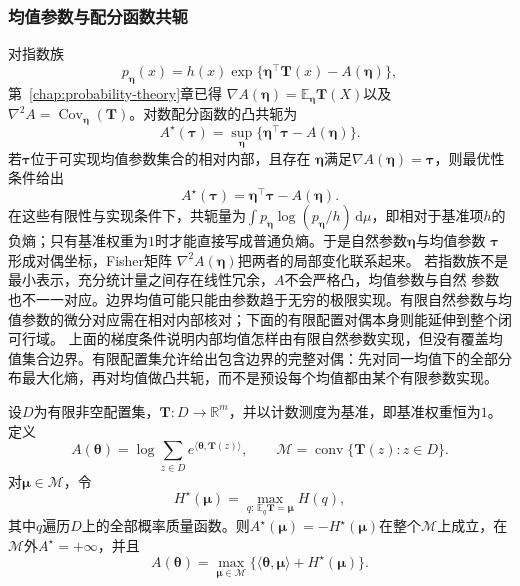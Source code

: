 \subsubsection{均值参数与配分函数共轭}
对指数族
\[
  p_{\bm{\eta}}(x)
  =h(x)\exp\{
    \bm{\eta}^{\top}\bm{T}(x)-A(\bm{\eta})\},
\]
第~\ref{chap:probability-theory}章已得
\(\nabla A(\bm{\eta})=\mathbb{E}_{\bm{\eta}}\bm{T}(X)\)以及
\(\nabla^2A=\operatorname{Cov}_{\bm{\eta}}(\bm{T})\)。对数配分函数的凸共轭为
\begin{equation}
  A^\star(\bm{\tau})
  =\sup_{\bm{\eta}}
  \{\bm{\eta}^{\top}\bm{\tau}-A(\bm{\eta})\}.
  \label{eq:information-log-partition-conjugate}
\end{equation}
若\(\bm{\tau}\)位于可实现均值参数集合的相对内部，且存在
\(\bm{\eta}\)满足\(\nabla A(\bm{\eta})=\bm{\tau}\)，则最优性条件给出
\[
  A^\star(\bm{\tau})=\bm{\eta}^{\top}\bm{\tau}-A(\bm{\eta}).
\]
在这些有限性与实现条件下，共轭量为\(\int p_{\bm\eta}\log(p_{\bm\eta}/h)\,\mathrm d\mu\)，即相对于基准项\(h\)的负熵；只有基准权重为\(1\)时才能直接写成普通负熵。于是自然参数\(\bm{\eta}\)与均值参数
\(\bm{\tau}\)形成对偶坐标，Fisher矩阵
\(\nabla^2A(\bm{\eta})\)把两者的局部变化联系起来。
若指数族不是最小表示，充分统计量之间存在线性冗余，\(A\)不会严格凸，均值参数与自然
参数也不一一对应。边界均值可能只能由参数趋于无穷的极限实现。有限自然参数与均值参数的微分对应需在相对内部核对；下面的有限配置对偶本身则能延伸到整个闭可行域。
上面的梯度条件说明内部均值怎样由有限自然参数实现，但没有覆盖均值集合边界。有限配置集允许给出包含边界的完整对偶：先对同一均值下的全部分布最大化熵，再对均值做凸共轭，而不是预设每个均值都由某个有限参数实现。
\begin{theorem}[有限配置上的配分函数与最大熵对偶]
  \label{thm:information-finite-entropy-duality}
  设\(D\)为有限非空配置集，\(\bm T:D\to\mathbb R^m\)，并以计数测度为基准，即基准权重恒为\(1\)。定义
  \[
    A(\bm\theta)=\log\sum_{z\in D}e^{\langle\bm\theta,\bm T(z)\rangle},\qquad
    \mathcal M=\operatorname{conv}\{\bm T(z):z\in D\}.
  \]
  对\(\bm\mu\in\mathcal M\)，令
  \[
    H^\star(\bm\mu)=\max_{q:\,\mathbb E_q\bm T=\bm\mu}H(q),
  \]
  其中\(q\)遍历\(D\)上的全部概率质量函数。则\(A^\star(\bm\mu)=-H^\star(\bm\mu)\)在整个\(\mathcal M\)上成立，在\(\mathcal M\)外\(A^\star=+\infty\)，并且
  \begin{equation}
    A(\bm\theta)=\max_{\bm\mu\in\mathcal M}
    \{\langle\bm\theta,\bm\mu\rangle+H^\star(\bm\mu)\}.
    \label{eq:information-finite-gibbs-duality}
  \end{equation}
\end{theorem}
